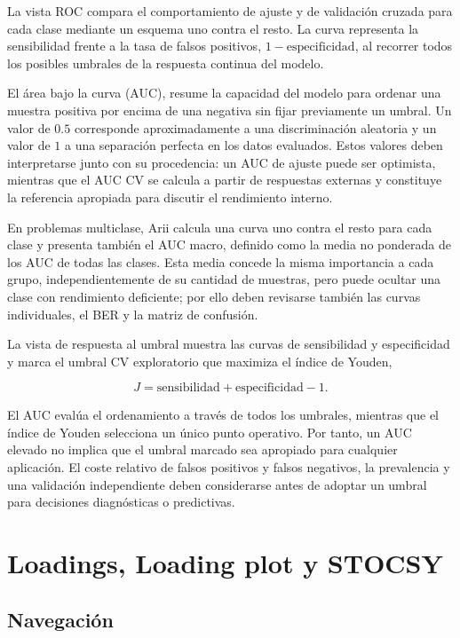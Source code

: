 \documentclass[11pt,a4paper,openany]{report}
\begin{document}
La vista ROC compara el comportamiento de ajuste y de validación cruzada para
cada clase mediante un esquema uno contra el resto. La curva representa la
sensibilidad frente a la tasa de falsos positivos,
$1-\mathrm{especificidad}$, al recorrer todos los posibles umbrales de la
respuesta continua del modelo.

El área bajo la curva (AUC), resume la capacidad
del modelo para ordenar una muestra positiva por encima de una negativa sin
fijar previamente un umbral. Un valor de $0.5$ corresponde aproximadamente a
una discriminación aleatoria y un valor de $1$ a una separación perfecta en
los datos evaluados. Estos valores deben interpretarse junto con su procedencia:
un AUC de ajuste puede ser optimista, mientras que el AUC CV se calcula a partir
de respuestas externas y constituye la referencia apropiada para discutir el
rendimiento interno.

En problemas multiclase, Arii calcula una curva uno contra el resto para cada
clase y presenta también el AUC macro, definido como la media no ponderada de
los AUC de todas las clases. Esta media concede la misma importancia a cada
grupo, independientemente de su cantidad de muestras, pero puede ocultar una
clase con rendimiento deficiente; por ello deben revisarse también las curvas
individuales, el BER y la matriz de confusión.

La vista de respuesta al umbral muestra las curvas de sensibilidad y
especificidad y marca el umbral CV exploratorio que maximiza el índice de Youden,

\[
J=\mathrm{sensibilidad}+\mathrm{especificidad}-1.
\]

El AUC evalúa el ordenamiento a través de todos los umbrales, mientras que el
índice de Youden selecciona un único punto operativo. Por tanto, un AUC elevado
no implica que el umbral marcado sea apropiado para cualquier aplicación. El
coste relativo de falsos positivos y falsos negativos, la prevalencia y una
validación independiente deben considerarse antes de adoptar un umbral para
decisiones diagnósticas o predictivas.

\chapter{Loadings, Loading plot y STOCSY}

\section{Navegación}
\end{document}
